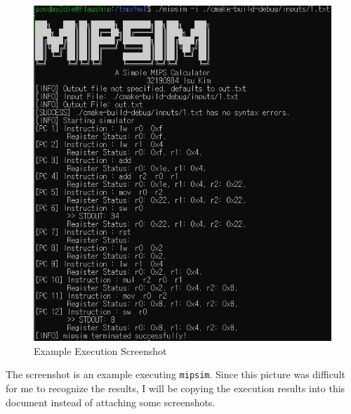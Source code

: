 \documentclass{homework}
\begin{document}
\begin{figure}[h]
\begin{center}
\includegraphics[scale=0.5]{mipsim.png}    
\caption{Example Execution Screenshot}
\end{center}
\end{figure}

The screenshot is an example executing \texttt{mipsim}. Since this picture was difficult for me to recognize the results, I will be copying the execution results into this document instead of attaching some screenshots.
\end{document}
